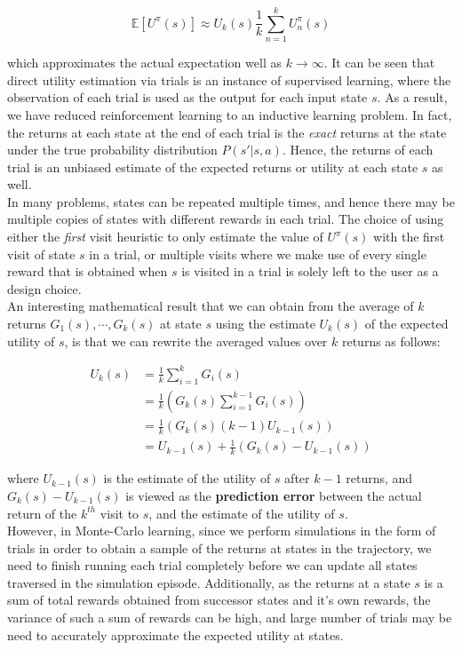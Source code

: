 \documentclass[11pt]{article}
\begin{document}
$$
\mathbb{E}[U^{\pi}(s)] \approx U_k(s) \frac{1}{k} \sum^k_{n=1} U^{\pi}_n(s)
$$

which approximates the actual expectation well as $k \rightarrow \infty$. It can be seen that direct utility estimation via trials is an instance of supervised learning, where the observation of each trial is used as the output for each input state $s$. As a result, we have reduced reinforcement learning to an inductive learning problem. In fact, the returns at each state at the end of each trial is the \textit{exact} returns at the state under the true probability distribution $P(s' | s, a)$. Hence, the returns of each trial is an unbiased estimate of the expected returns or utility at each state $s$ as well. \\

In many problems, states can be repeated multiple times, and hence there may be multiple copies of states with different rewards in each trial. The choice of using either the \textit{first} visit heuristic to only estimate the value of $U^{\pi}(s)$ with the first visit of state $s$ in a trial, or multiple visits where we make use of every single reward that is obtained when $s$ is visited in a trial is solely left to the user as a design choice.\\

An interesting mathematical result that we can obtain from the average of $k$ returns $G_1(s), \cdots, G_k(s)$ at state $s$ using the estimate $U_k(s)$ of the expected utility of $s$, is that we can rewrite the averaged values over $k$ returns as follows:

$$
\begin{aligned}
U_k(s) &= \frac{1}{k} \sum^k_{i=1} G_i(s)\\
&= \frac{1}{k} \left(G_k(s) \sum^{k-1}_{i=1} G_i(s) \right)\\
&= \frac{1}{k} \left(G_k(s) (k-1) U_{k-1}(s) \right)\\
&= U_{k-1}(s) + \frac{1}{k} \left( G_k(s) - U_{k-1}(s) \right)
\end{aligned}
$$

where $U_{k-1}(s)$ is the estimate of the utility of $s$ after $k-1$ returns, and $G_k(s) - U_{k-1}(s)$ is viewed as the \textbf{prediction error} between the actual return of the $k^{th}$ visit to $s$, and the estimate of the utility of $s$.\\

However, in Monte-Carlo learning, since we perform simulations in the form of trials in order to obtain a sample of the returns at states in the trajectory, we need to finish running each trial completely before we can update all states traversed in the simulation episode. Additionally, as the returns at a state $s$ is a sum of total rewards obtained from successor states and it's own rewards, the variance of such a sum of rewards can be high, and large number of trials may be need to accurately approximate the expected utility at states.\\
\end{document}
